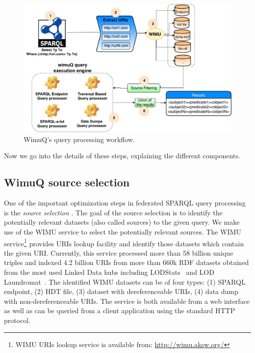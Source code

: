 \begin{figure}[htb] 
	\centering
	\includegraphics[width=\linewidth]{img/wimuT3.pdf}
	\caption{WimuQ's query processing workflow.}
	\label{fig:approach}
\end{figure}

Now we go into the details of these steps, explaining the different components. 

\subsection{WimuQ source selection}
One of the important optimization steps in federated SPARQL query processing is the \emph{source selection} \cite{costfed2017,hibiscus2014}. The goal of the source selection is to identify the potentially relevant datasets (also called sources) to the given query. We make use of the WIMU service \cite{valdestilhas2018my} to select the potentially relevant sources. The WIMU service\footnote{WIMU URIs lookup service is available from: \url{http://wimu.aksw.org/}} provides URIs lookup facility and identify those datasets which contain the given URI. Currently, this service processed more than 58 billion unique triples and indexed 4.2 billion URIs from more than 660k RDF datasets obtained from the most used Linked Data hubs including LODStats~\cite{auer2012lodstats} and LOD Laundromat~\cite{beek2014lod}. The identified WIMU datasets can be of four types: (1) SPARQL endpoint, (2) HDT file, (3) dataset with dereferenceable URIs, (4) data dump with non-dereferenceable URIs. 
The service is both available from a web interface as well as can be queried from a client application using the standard HTTP protocol. 

